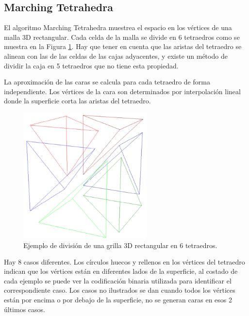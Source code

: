 \documentclass[12pt]{article}
\begin{document}
\subsection{Marching Tetrahedra}
\noindent El algoritmo Marching Tetrahedra\cite{marching}\cite{marchingt} muestrea el espacio en los vértices de una malla 3D rectangular. Cada celda de la malla se divide en 6 tetraedros como se muestra en la Figura \ref{6tet}. Hay que tener en cuenta que las aristas del tetraedro se alinean con las de las celdas de las cajas adyacentes, y existe un método de dividir la caja en 5 tetraedros que no tiene esta propiedad.

La aproximación de las caras se calcula para cada tetraedro de forma independiente. Los vértices de la cara son determinados por interpolación lineal donde la superficie corta las aristas del tetraedro.
\begin{figure}[h!]
\includegraphics[width=0.6\textwidth,center]{mt1.png}
\caption{Ejemplo de división de una grilla 3D rectangular en 6 tetraedros.}
\label{6tet}
\end{figure}
\clearpage
Hay 8 casos diferentes. Los círculos huecos y rellenos en los vértices del tetraedro indican que los vértices están en diferentes lados de la superficie, al costado de cada ejemplo se puede ver la codificación binaria utilizada para identificar el correspondiente caso. Los casos no ilustrados se dan cuando todos los vértices están por encima o por debajo de la superficie, no se generan caras en esos 2 últimos casos.
\end{document}
